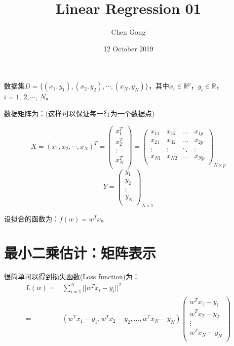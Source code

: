 \documentclass[a4paper]{article}
\title{Linear Regression 01}
\author{Chen Gong}
\date{12 October 2019}
\numberwithin{equation}{section}
\begin{document}
\maketitle

数据集$D=\{(x_1, y_1), (x_2, y_2), \cdots, (x_N, y_N)\}$，其中$x_i\in\mathbb{R}^{p}$，$y_i\in\mathbb{R}$，$i=1, \ 2,\cdots,\ N$。

数据矩阵为：(这样可以保证每一行为一个数据点)

\begin{equation}
    X=(x_1, x_2, \cdots, x_N)^T=
    \begin{pmatrix}
    x_1^T \\ 
    x_2^T \\
    \vdots\\
    x_N^T \\
    \end{pmatrix} =
    \begin{pmatrix}
    x_{11} & x_{12} & \dots & x_{1p}\\
    x_{21} & x_{32} & \dots & x_{2p}\\
    \vdots & \vdots & \ddots & \vdots\\
    x_{N1} & x_{N2} & \dots & x_{Np}\\
    \end{pmatrix}_{N\times p}
\end{equation}
\begin{equation}
    Y=
    \begin{pmatrix}
    y_1 \\ 
    y_2 \\
    \vdots\\
    y_N \\
    \end{pmatrix}_{N\times 1}
\end{equation}

设拟合的函数为：$f(w)=w^T x$。

\section{最小二乘估计：矩阵表示}
很简单可以得到损失函数(Loss function)为：
\begin{align}
     L(w) = & \sum_{i=1}^{N}||w^T x_i-y_i||^2 \\
          = & (w^T x_1-y_1, w^T x_2-y_2, \dots, w^T x_N-y_N)
          \begin{pmatrix}
            w^T x_1-y_1\\
            w^T x_2-y_2\\
            \vdots\\
            w^T x_N-y_N\\
          \end{pmatrix}                      
\end{align}
\end{document}
